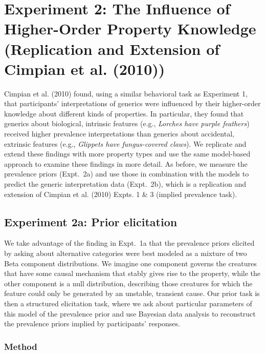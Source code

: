 \documentclass[floatsintext,doc]{apa6}
\begin{document}
\hypertarget{preliminary-study-replication-and-extension-of-cimpian-et-al.-2010}{%
\section{Experiment 2: The Influence of Higher-Order Property Knowledge (Replication and Extension of Cimpian et al. (2010))}\label{preliminary-study-replication-and-extension-of-cimpian-et-al.-2010}}

Cimpian et al. (2010) found, using a similar behavioral task as Experiment 1, that participants' interpretations of generics were influenced by their higher-order knowledge about different kinds of properties. 
In particular, they found that generics about biological, intrinsic features (e.g., \emph{Lorches have purple feathers}) received higher prevalence interpretations than generics about accidental, extrinsic features (e.g., \emph{Glippets have fungus-covered claws}). 
We replicate and extend these findings with more property types and use the same model-based approach to examine these findings in more detail. As before, we measure the prevalence priors (Expt.~2a) and use those in combination with the models to predict the generic interpretation data (Expt.~2b), which is a replication and extension of Cimpian et al. (2010) Expts. 1 \& 3 (implied prevalence task). 

\subsection{Experiment 2a: Prior elicitation}

We take advantage of the finding in Expt.~1a that the prevalence priors elicited by asking about alternative categories were best modeled as a mixture of two Beta component distributions. 
We imagine one component governs the creatures that have some causal mechanism that stably gives rise to the property, while the other component is a null distribution, describing those creatures for which the feature could only be generated by an unstable, transient cause. 
Our prior task is then a structured elicitation task, where we ask about particular parameters of this model of the prevalence prior and use Bayesian data analysis to reconstruct the prevalence priors implied by participants' responses. 


\subsubsection{Method}\label{method}
\end{document}
